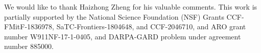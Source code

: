 \begin{ack}
We would like to thank Haizhong Zheng for his valuable comments. 
This work is partially supported by the National Science Foundation (NSF) Grants
CCF-FMitF-1836978, SaTC-Frontiers-1804648, and CCF-2046710,
and ARO grant number W911NF-17-1-0405, and DARPA-GARD problem under agreement number 885000.
\end{ack}